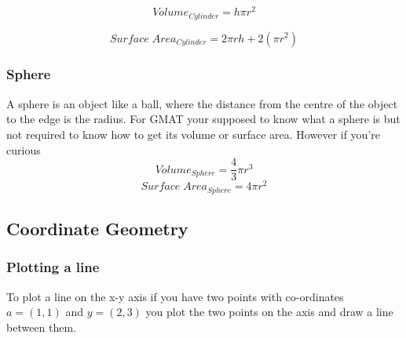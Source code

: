 \documentclass{article}
\begin{document}
\begin{equation}
Volume_{ Cylinder} = h \pi r^ 2
\end{equation}


\begin{equation}
Surface\;Area_{ Cylinder} = 2 \pi r h + 2(\pi r^ 2 )
\end{equation}

\subsubsection{Sphere}
A sphere is an object like a ball, where the distance from the centre of the object to the edge is the radius. For GMAT your supposed to know what a sphere is but not required to know how to get its volume or surface area.
However if you're curious 
\begin{equation}
Volume_{Sphere} = \frac{4}{3} \pi r^{3}
\end{equation}
\begin{equation}
Surface\;Area_{Sphere} = 4 \pi r^{2}
\end{equation}

\newpage
\subsection{Coordinate Geometry}
\subsubsection{Plotting a line}
To plot a line on the x-y axis if you have two points with co-ordinates $a = (1,1)$ and $y = (2,3)$ you plot the two points on the axis and draw a line between them.



\end{document}
